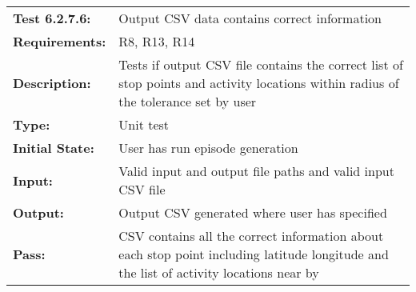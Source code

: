 \documentclass[12pt, titlepage]{article}
\begin{document}
{\begin{tabular}{|l|p{10cm}|}
    \hline
    \bf{Test} 6.2.7.6: & Output CSV data contains correct information\\
    \bf{Requirements}: &  R8, R13, R14\\
    \bf{Description}: & Tests if output CSV file contains the correct list of stop points and activity locations within radius of the tolerance set by user\\
    \bf{Type}: & Unit test\\
    \bf{Initial State}: & User has run episode generation\\
    \bf{Input}: & Valid input and output file paths and valid input CSV file \\
    \bf{Output}: & Output CSV generated where user has specified\\
    \bf{Pass}: & CSV contains all the correct information about each stop point including latitude longitude and the list of activity locations near by \\
    \hline
\end{tabular}}
\end{document}

